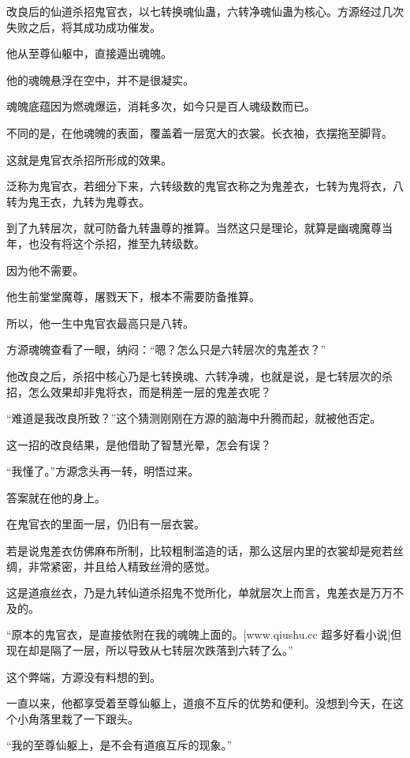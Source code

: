 
\begin{this_body}

改良后的仙道杀招鬼官衣，以七转换魂仙蛊，六转净魂仙蛊为核心。方源经过几次失败之后，将其成功成功催发。

他从至尊仙躯中，直接遁出魂魄。

他的魂魄悬浮在空中，并不是很凝实。

魂魄底蕴因为燃魂爆运，消耗多次，如今只是百人魂级数而已。

不同的是，在他魂魄的表面，覆盖着一层宽大的衣裳。长衣袖，衣摆拖至脚背。

这就是鬼官衣杀招所形成的效果。

泛称为鬼官衣，若细分下来，六转级数的鬼官衣称之为鬼差衣，七转为鬼将衣，八转为鬼王衣，九转为鬼尊衣。

到了九转层次，就可防备九转蛊尊的推算。当然这只是理论，就算是幽魂魔尊当年，也没有将这个杀招，推至九转级数。

因为他不需要。

他生前堂堂魔尊，屠戮天下，根本不需要防备推算。

所以，他一生中鬼官衣最高只是八转。

方源魂魄查看了一眼，纳闷：“嗯？怎么只是六转层次的鬼差衣？”

他改良之后，杀招中核心乃是七转换魂、六转净魂，也就是说，是七转层次的杀招，怎么效果却非鬼将衣，而是稍差一层的鬼差衣呢？

“难道是我改良所致？”这个猜测刚刚在方源的脑海中升腾而起，就被他否定。

这一招的改良结果，是他借助了智慧光晕，怎会有误？

“我懂了。”方源念头再一转，明悟过来。

答案就在他的身上。

在鬼官衣的里面一层，仍旧有一层衣裳。

若是说鬼差衣仿佛麻布所制，比较粗制滥造的话，那么这层内里的衣裳却是宛若丝绸，非常紧密，并且给人精致丝滑的感觉。

这是道痕丝衣，乃是九转仙道杀招鬼不觉所化，单就层次上而言，鬼差衣是万万不及的。

“原本的鬼官衣，是直接依附在我的魂魄上面的。[www.qiushu.cc 超多好看小说]但现在却是隔了一层，所以导致从七转层次跌落到六转了么。”

这个弊端，方源没有料想的到。

一直以来，他都享受着至尊仙躯上，道痕不互斥的优势和便利。没想到今天，在这个小角落里栽了一下跟头。

“我的至尊仙躯上，是不会有道痕互斥的现象。”


\end{this_body}
